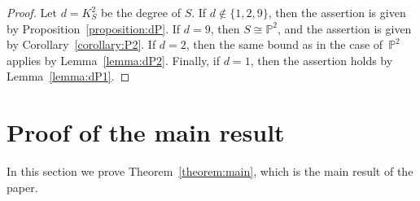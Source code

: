 \documentclass[12pt]{amsart}
\numberwithin{equation}{section}
\theoremstyle{definition}
\newcommand{\PP}{\mathbb P}
\begin{document}
\begin{proof}
Let $d=K_S^2$ be the degree of $S$.
If $d\not\in\{1,2,9\}$, then the assertion is given by Proposition~\ref{proposition:dP}.
If $d=9$, then $S\cong \PP^2$, and
the assertion is given by Corollary~\ref{corollary:P2}.
If $d=2$, then the same bound as in the case of~$\PP^2$ applies
by Lemma~\ref{lemma:dP2}.
Finally, if $d=1$, then the assertion holds by Lemma~\ref{lemma:dP1}.
\end{proof}


\section{Proof of the main result}
\label{section:proof}


In this section we prove Theorem~\ref{theorem:main}, which is the main result of the paper.
\end{document}
